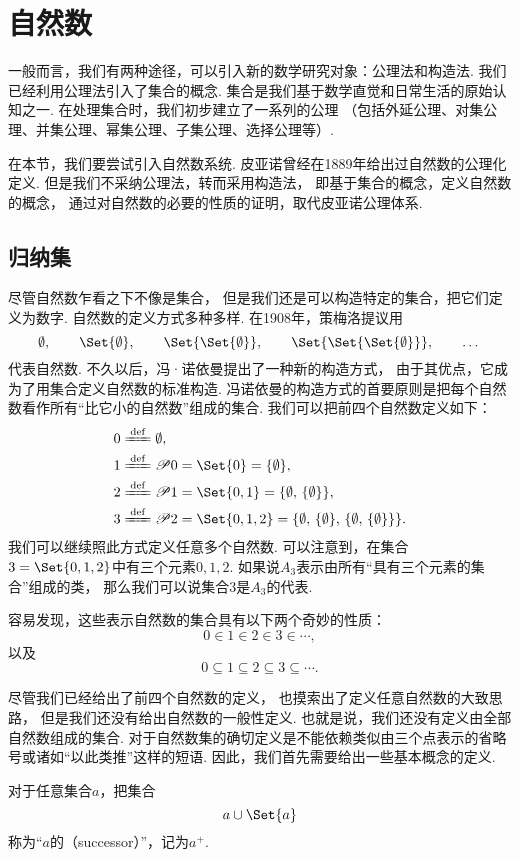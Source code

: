 
\section{自然数}
一般而言，我们有两种途径，可以引入新的数学研究对象：公理法和构造法.
我们已经利用公理法引入了集合的概念.
集合是我们基于数学直觉和日常生活的原始认知之一.
在处理集合时，我们初步建立了一系列的公理%
（包括外延公理、对集公理、并集公理、幂集公理、子集公理、选择公理等）.

在本节，我们要尝试引入自然数系统.
皮亚诺曾经在1889年给出过自然数的公理化定义.
但是我们不采纳公理法，转而采用构造法，
即基于集合的概念，定义自然数的概念，
通过对自然数的必要的性质的证明，取代皮亚诺公理体系.

\subsection{归纳集}
尽管自然数乍看之下不像是集合，
但是我们还是可以构造特定的集合，把它们定义为数字.
自然数的定义方式多种多样.
在1908年，策梅洛提议用\[
	\emptyset, \qquad
	\Set{\emptyset}, \qquad
	\Set{\Set{\emptyset}}, \qquad
	\Set{\Set{\Set{\emptyset}}}, \qquad
	\dotsc
\]代表自然数.
不久以后，冯·诺依曼提出了一种新的构造方式，
由于其优点，它成为了用集合定义自然数的标准构造.
冯诺依曼的构造方式的首要原则是把每个自然数看作所有“比它小的自然数”组成的集合.
我们可以把前四个自然数定义如下：\begin{align*}
	&0 \defeq \emptyset, \\
	&1 \defeq \Powerset0 = \Set{0} = \NaturalSet{1}, \\
	&2 \defeq \Powerset1 = \Set{0,1} = \NaturalSet{2}, \\
	&3 \defeq \Powerset2 = \Set{0,1,2} = \NaturalSet{3}.
\end{align*}
我们可以继续照此方式定义任意多个自然数.
可以注意到，在集合\(3=\Set{0,1,2}\)中有三个元素\(0,1,2\).
如果说\(A_3\)表示由所有“具有三个元素的集合”组成的类，
那么我们可以说集合\(3\)是\(A_3\)的代表.

容易发现，这些表示自然数的集合具有以下两个奇妙的性质：\[
	0 \in 1 \in 2 \in 3 \in \dotsb,
\]
以及\[
	0 \subseteq 1 \subseteq 2 \subseteq 3 \subseteq \dotsb.
\]

尽管我们已经给出了前四个自然数的定义，
也摸索出了定义任意自然数的大致思路，
但是我们还没有给出自然数的一般性定义.
也就是说，我们还没有定义由全部自然数组成的集合.
对于自然数集的确切定义是不能依赖类似由三个点表示的省略号或诸如“以此类推”这样的短语.
因此，我们首先需要给出一些基本概念的定义.
\begin{definition}[后继]\label{definition:集合论.后继的定义}
对于任意集合\(a\)，把集合\[
	a \cup \Set{a}
\]
称为“\(a\)的（successor）”，记为\(a^+\).
\end{definition}

